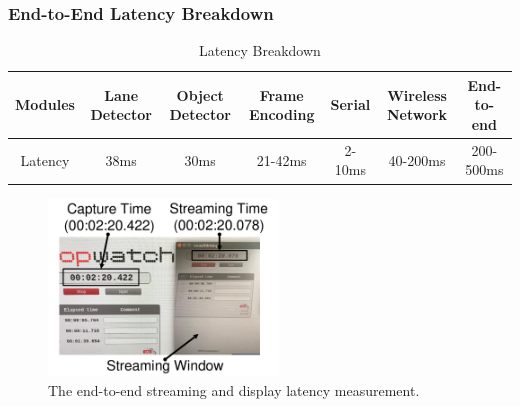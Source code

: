 \subsubsection{End-to-End Latency Breakdown}


\begin{table}[t]
  \centering
  \caption[latency]{Latency Breakdown}
  \vspace{-0.0cm}
  \label{latency}
  \begin{tabular}{|c|c|c|c|c|c|c|}
  \hline
Modules & Lane Detector & Object Detector  &  Frame Encoding  &  Serial & Wireless Network  & End-to-end  
\\  \hline
Latency & 38ms & 30ms & 21-42ms & 2-10ms & 40-200ms & 200-500ms
\\  \hline      
  \end{tabular}
  \vspace{-0.0cm}
\end{table}


\begin{figure}[t]
\centering
\vspace{-0.0cm}
\includegraphics[width=2.4in,angle=0]{Figs/RTDrive/evaluation/endtoend.pdf}
\vspace{-0.2cm}
\caption{The end-to-end streaming and display latency measurement.}
\vspace{-0.2cm}
\label{endtoend}
\centering
\end{figure}



